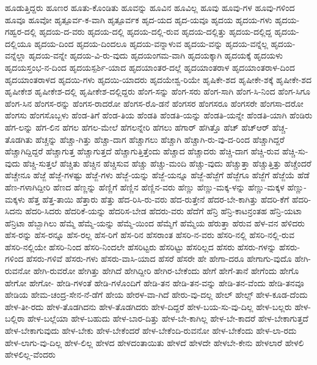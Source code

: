 {ಹೂಡುತ್ತಿದ್ದರು
ಹೂಣರ
ಹೂತು-ಕೊಂಡಿತು
ಹೂವನ್ನು
ಹೂವಿನ
ಹೂವಿಲ್ಲ
ಹೂವು
ಹೂವು-ಗಳ
ಹೂವು-ಗಳಿಂದ
ಹೂವೂ
ಹೂವೋ
ಹೃತ್ಪೂರ್ವ-ಕ-ವಾಗಿ
ಹೃತ್ಪೂರ್ವಕ
ಹೃದ-ಯದ
ಹೃದ-ಯವೂ
ಹೃದಯ
ಹೃದಯ-ಗಳು
ಹೃದಯ-ಗಹ್ವರ-ದಲ್ಲಿ
ಹೃದಯ-ದ-ವರು
ಹೃದಯ-ದಲ್ಲಿ
ಹೃದಯ-ದಲ್ಲಿ-ರುವ
ಹೃದಯ-ದಲ್ಲಿತ್ತು
ಹೃದಯ-ದಲ್ಲಿದ್ದ
ಹೃದಯ-ದಲ್ಲಿಯೂ
ಹೃದಯ-ದಿಂದ
ಹೃದಯ-ದಿಂದಲೂ
ಹೃದಯ-ವನ್ನಾಳುವ
ಹೃದಯ-ವನ್ನು
ಹೃದಯ-ವನ್ನೆಲ್ಲ
ಹೃದಯ-ವನ್ನೆಲ್ಲಾ
ಹೃದಯ-ವನ್ನೇ
ಹೃದಯ-ವಿ-ರು-ವುದು
ಹೃದಯಂಗಮ-ವಾಗಿ
ಹೃದಯಕ್ಕಾಗಿ
ಹೃದಯಕ್ಕೆ
ಹೃದಯಳು
ಹೃದಯಸ್ತಂಭ-ನ-ದಿಂದ
ಹೃದಯಸ್ಪರ್ಶಿ-ಯಾದ
ಹೃದಯಾಂತರ-ದಲ್ಲೆ
ಹೃದಯಾಂತರಾಳ
ಹೃದಯಾಂತರಾಳ-ದಿಂದ
ಹೃದಯಾಂತರಾಳದ
ಹೃದಯಿ-ಗಳು
ಹೃದಯಿ-ಯಾದರು
ಹೃದಯೇಶ್ವ-ರಿಯೇ
ಹೃಷಿಕೇ-ಶದ
ಹೃಷೀಕೇ-ಶಕ್ಕೆ
ಹೃಷೀಕೇ-ಶದ
ಹೃಷೀಕೇಶ
ಹೃಷೀಕೇಶ-ದಲ್ಲಿ
ಹೃಷೀಕೇಶ-ದಲ್ಲಿದ್ದರು
ಹೆಂಗ-ಸನ್ನು
ಹೆಂಗ-ಸರು
ಹೆಂಗ-ಸಾಗಿ
ಹೆಂಗ-ಸಿ-ನಿಂದ
ಹೆಂಗ-ಸಿಗೂ
ಹೆಂಗ-ಸಿನ
ಹೆಂಗಸ-ರನ್ನು
ಹೆಂಗಸ-ರಾದರೋ
ಹೆಂಗಸ-ರೊ-ಡನೆ
ಹೆಂಗಸರ
ಹೆಂಗಸರೂ
ಹೆಂಗಸರೇ
ಹೆಂಗಸಾ-ದರೋ
ಹೆಂಗಸು
ಹೆಂಗಸೊಬ್ಬಳು
ಹೆಂಡ-ತಿಗೆ
ಹೆಂಡ-ತಿಯ
ಹೆಂಡತಿ
ಹೆಂಡತಿ-ಯನ್ನು
ಹೆಂಡತಿ-ಯನ್ನೇ
ಹೆಂಡತಿ-ಯಾಗಿ
ಹೆಂಡಿರು
ಹೆಗ-ಲನ್ನು
ಹೆಗ-ಲಿನ
ಹೆಗಲ
ಹೆಗಲ-ಮೇಲೆ
ಹೆಗಲನ್ನೇರಿ
ಹೆಗಲು
ಹೆಗಾರ್
ಹೆಗಿತ್ತೊ
ಹೆಚ್
ಹೆಚ್ಆರ್
ಹೆಚ್ಚ-ತೊಡಗಿತು
ಹೆಚ್ಚನ್ನು
ಹೆಚ್ಚಾ-ಗಿತ್ತು
ಹೆಚ್ಚಾ-ದಾಗ
ಹೆಚ್ಚಾಗಲು
ಹೆಚ್ಚಾಗಿ
ಹೆಚ್ಚಾಗಿ-ರು-ವು-ದ-ರಿಂದ
ಹೆಚ್ಚಾಗಿದ್ದರೆ
ಹೆಚ್ಚಾಗಿದ್ದಿದ್ದರೆ
ಹೆಚ್ಚಾಗುತ್ತ
ಹೆಚ್ಚಾಗುತ್ತದೆ
ಹೆಚ್ಚಾಗುತ್ತಿತ್ತೆಂದು
ಹೆಚ್ಚಾದ
ಹೆಚ್ಚಾದರು
ಹೆಚ್ಚಿ-ದಾಗ
ಹೆಚ್ಚಿ-ರುವ
ಹೆಚ್ಚಿ-ಸು-ವುದು
ಹೆಚ್ಚಿ-ಸುತ್ತಲೆ
ಹೆಚ್ಚಿತು
ಹೆಚ್ಚಿನ
ಹೆಚ್ಚಿಸುವ
ಹೆಚ್ಚು
ಹೆಚ್ಚು-ಮಂದಿ
ಹೆಚ್ಚು-ವುದು
ಹೆಚ್ಚುತ್ತಾ
ಹೆಚ್ಚುತ್ತಿತ್ತು
ಹೆಚ್ಚೆಂದರೆ
ಹೆಚ್ಚೇನೂ
ಹೆಜ್ಜೆ
ಹೆಜ್ಜೆ-ಗಳಷ್ಟು
ಹೆಜ್ಜೆ-ಗಳು
ಹೆಜ್ಜೆ-ಯನ್ನು
ಹೆಜ್ಜೆ-ಯನ್ನೂ
ಹೆಜ್ಜೆ-ಹೆಜ್ಜೆಗೆ
ಹೆಜ್ಜೆಗೂ
ಹೆಜ್ಜೆಗೆ
ಹೆಜ್ಜೆಯೆ
ಹೆಡೆ
ಹೆಣ-ಗಳಾಗಿದ್ದೀರಿ
ಹೆಣದ
ಹೆಣ್ಣನ್ನು
ಹೆಣ್ಣಿಗೆ
ಹೆಣ್ಣಿನ
ಹೆಣ್ಣಿನ-ವರು
ಹೆಣ್ಣು
ಹೆಣ್ಣು-ಮಕ್ಕ-ಳನ್ನು
ಹೆಣ್ಣು-ಮಕ್ಕಳ
ಹೆಣ್ಣು-ಮಕ್ಕಳು
ಹೆತ್ತ
ಹೆತ್ತ-ತಾಯಿ
ಹೆತ್ತಾರು
ಹೆತ್ತು
ಹೆದ-ರಿಸಿ-ರು-ವರು
ಹೆದ-ರುತ್ತೇನೆ
ಹೆದರ-ಬೇ-ಕಾಗಿತ್ತು
ಹೆದರಿ-ಕೆಗೆ
ಹೆದರಿ-ಸಿದನು
ಹೆದರಿ-ಸಿದರು
ಹೆದರಿಕೆ-ಯನ್ನು
ಹೆದರಿಸ-ಬೇಡ
ಹೆದರು-ವರು
ಹೆದೆಗೆ
ಹೆನ್ರಿ
ಹೆನ್ರಿ-ಕಾಟನ್ರಂತಹ
ಹೆನ್ರಿ-ಯಟಾ
ಹೆನ್ರಿಟಾ
ಹೆಬ್ಬಾಗಿಲು
ಹೆಮ್ಮೆ
ಹೆಮ್ಮೆ-ಯನ್ನು
ಹೆಮ್ಮೆ-ಯಿಂದ
ಹೆಮ್ಮೆಗೆ
ಹೆಮ್ಮೆಯ
ಹೆರುತ್ತಾ
ಹೆರುವ
ಹೆಳ-ವನ
ಹೆಳಿದರು
ಹೆಸ-ರನ್ನು
ಹೆಸ-ರನ್ನೂ
ಹೆಸ-ರಲ್ಲ
ಹೆಸ-ರಿಗೆ
ಹೆಸ-ರಿನ
ಹೆಸರಾಂತ
ಹೆಸರಿ-ನ-ವರು
ಹೆಸರಿ-ನಲ್ಲಿ
ಹೆಸರಿ-ನಲ್ಲಿ-ರುವ
ಹೆಸರಿ-ನಲ್ಲಿಯೇ
ಹೆಸರಿ-ನಿಂದ
ಹೆಸರಿ-ನಿಂದಲೇ
ಹೆಸರಿಟ್ಟರು
ಹೆಸರಿಟ್ಟು
ಹೆಸರಿಲ್ಲದ
ಹೆಸರು
ಹೆಸರು-ಗಳನ್ನು
ಹೆಸರು-ಗಳಿಂದ
ಹೆಸರು-ಗಳಿವೆ
ಹೆಸರು-ಗಳು
ಹೆಸರು-ವಾಸಿ-ಯಾದ
ಹೆಸರೆ
ಹೆಸರೇ
ಹೇ
ಹೇಗಾ-ದರೂ
ಹೇಗಾಗು-ವುದೊ
ಹೇಗಿ-ರುವನೋ
ಹೇಗಿ-ರುವರೋ
ಹೇಗಿತ್ತು
ಹೇಗಿದೆ
ಹೇಗಿದ್ದೀರಿ
ಹೇಗಿರ-ಬೇಕೆಂದು
ಹೇಗೆ
ಹೇಗೆ-ತಾನೆ
ಹೇಗೆಂದು
ಹೇಗೊ
ಹೇಗೋ
ಹೇಗೋ-
ಹೇಡಿ-ಗಳಂತೆ
ಹೇಡಿ-ಗಳೊಂದಿಗೆ
ಹೇಡಿ-ತನ
ಹೇಡಿ-ತನ-ವನ್ನು
ಹೇಡಿ-ತನ-ವೆಂದು
ಹೇಡಿ-ತನವೂ
ಹೇಡಿಯ
ಹೇಮ-ಚಂದ್ರ-ಸೇನ-ನೆ-ಡೆಗೆ
ಹೇಯ
ಹೇರಳ-ವಾ-ಗಿದೆ
ಹೇರು-ವು-ದಲ್ಲ
ಹೇಲ್
ಹೇಲ್ಸ್
ಹೇಳ-ಕೂಡ-ದೆಂದು
ಹೇಳ-ತೀ-ರದು
ಹೇಳ-ತೊಡಗಿದನು
ಹೇಳ-ತೊಡಗಿದರು
ಹೇಳ-ದಿದ್ದರೆ
ಹೇಳ-ಬಯ-ಸು-ವು-ದಿಲ್ಲ
ಹೇಳ-ಬಲ್ಲರು
ಹೇಳ-ಬಲ್ಲಿರಾ
ಹೇಳ-ಬಲ್ಲೆಯಾ
ಹೇಳ-ಬಹುದು
ಹೇಳ-ಬಾರ-ದಿತ್ತು
ಹೇಳ-ಬೇ-ಕಾಗಿಲ್ಲ
ಹೇಳ-ಬೇ-ಕಾದರೆ
ಹೇಳ-ಬೇಕಾಗುತ್ತದೆ
ಹೇಳ-ಬೇಕಾಗುವುದು
ಹೇಳ-ಬೇಕು
ಹೇಳ-ಬೇಕೆಂದರೆ
ಹೇಳ-ಬೇಕೆಂದಿ-ರುವನೋ
ಹೇಳ-ಬೇಕೆಂದು
ಹೇಳ-ಲಾ-ರದು
ಹೇಳ-ಲಾಗು-ವು-ದಿಲ್ಲ
ಹೇಳ-ಲಿಲ್ಲ
ಹೇಳದ
ಹೇಳದಂತಾಯಿತು
ಹೇಳದೆ
ಹೇಳದೇ
ಹೇಳಬೇ-ಕೇನು
ಹೇಳಲಾರೆ
ಹೇಳಲಿ
ಹೇಳಲಿಲ್ಲ-ವೆಂದರು
}
